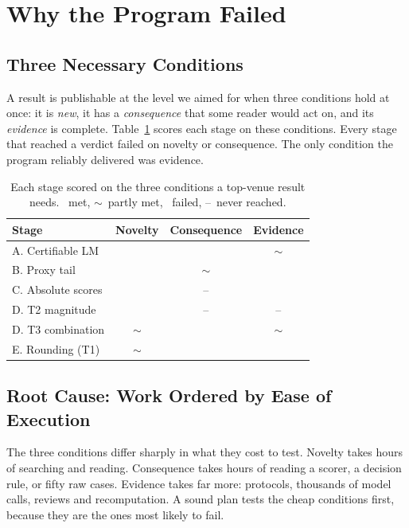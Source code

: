 \documentclass[11pt]{article}
\newcommand{\yes}{\textcolor{okgreen}{\ding{51}}}
\newcommand{\no}{\textcolor{failred}{\ding{55}}}
\newcommand{\partly}{\textcolor{black!55}{$\sim$}}
\newcommand{\na}{\textcolor{black!40}{--}}
\begin{document}
\section{Why the Program Failed}
\label{sec:why}

\subsection{Three Necessary Conditions}

A result is publishable at the level we aimed for when three conditions hold at once: it is \emph{new}, it has a \emph{consequence} that some reader would act on, and its \emph{evidence} is complete. Table~\ref{tab:factors} scores each stage on these conditions. Every stage that reached a verdict failed on novelty or consequence. The only condition the program reliably delivered was evidence.

\begin{table}[t]
\centering
\small
\setlength{\tabcolsep}{4.5pt}
\begin{tabular}{@{}lccc@{}}
\toprule
\textbf{Stage} & \textbf{Novelty} & \textbf{Consequence} & \textbf{Evidence} \\
\midrule
A. Certifiable LM & \no & \no & \partly \\
B. Proxy tail & \no & \partly & \no \\
C. Absolute scores & \no & \na & \no \\
D. T2 magnitude & \no & \na & \na \\
D. T3 combination & \partly & \no & \partly \\
E. Rounding (T1) & \partly & \no & \yes \\
\bottomrule
\end{tabular}
\caption{Each stage scored on the three conditions a top-venue result needs. \yes\ met, \partly\ partly met, \no\ failed, \na\ never reached.}
\label{tab:factors}
\end{table}

\subsection{Root Cause: Work Ordered by Ease of Execution}

The three conditions differ sharply in what they cost to test. Novelty takes hours of searching and reading. Consequence takes hours of reading a scorer, a decision rule, or fifty raw cases. Evidence takes far more: protocols, thousands of model calls, reviews and recomputation. A sound plan tests the cheap conditions first, because they are the ones most likely to fail.
\end{document}
